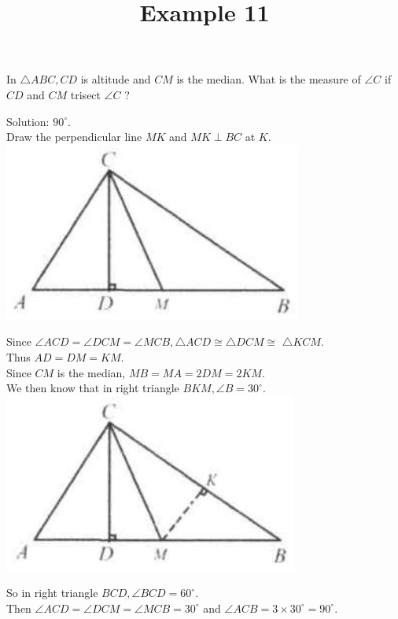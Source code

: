 \documentclass{article}
\title{Example 11}
\date{}
\begin{document}
\maketitle

In \(\triangle A B C, C D\) is altitude and \(C M\) is the median. What is the measure of \(\angle C\) if \(C D\) and \(C M\) trisect \(\angle C\) ?

Solution: \(90^{\circ}\).\\
Draw the perpendicular line \(M K\) and \(M K \perp B C\) at \(K\).\\
\centering
\includegraphics[width=\textwidth]{images/problem_image_1.jpg}

Since \(\angle A C D=\angle D C M=\angle M C B, \triangle A C D \cong \triangle D C M \cong\) \(\triangle K C M\).\\
Thus \(A D=D M=K M\).\\
Since \(C M\) is the median, \(M B=M A=2 D M=2 K M\).\\
We then know that in right triangle \(B K M, \angle B=30^{\circ}\).\\
\centering
\includegraphics[width=\textwidth]{images/reasoning_image_1.jpg}

So in right triangle \(B C D, \angle B C D=60^{\circ}\).\\
Then \(\angle A C D=\angle D C M=\angle M C B=30^{\circ}\) and \(\angle A C B=3 \times 30^{\circ}=90^{\circ}\).
\end{document}
